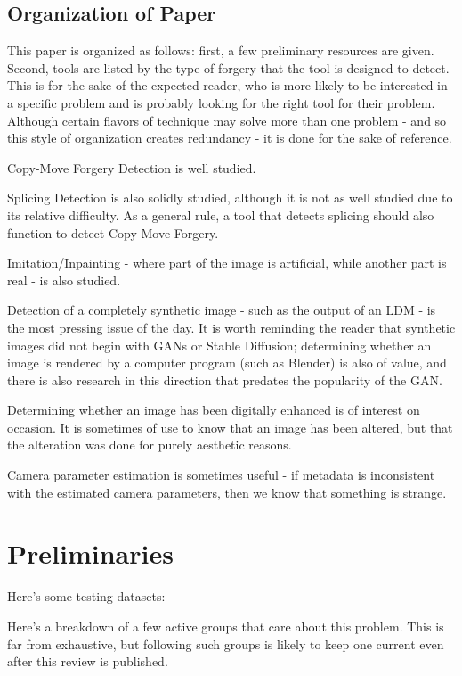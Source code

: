 \documentclass[compsoc]{IEEEtran}
\begin{document}
\subsection{Organization of Paper}
This paper is organized as follows: first, a few preliminary resources are given. Second, tools are listed by the type of forgery that the tool is designed to detect.
This is for the sake of the expected reader, who is more likely to be interested in a specific problem and is probably looking for the right tool for their problem.
Although certain flavors of technique may solve more than one problem - and so this style of organization creates redundancy - it is done for the sake of reference.

Copy-Move Forgery Detection is well studied. 

Splicing Detection is also solidly studied, although it is not as well studied due to its relative difficulty. As a general rule, a tool that detects splicing should also function to detect Copy-Move Forgery.

Imitation/Inpainting - where part of the image is artificial, while another part is real - is also studied.

Detection of a completely synthetic image - such as the output of an LDM - is the most pressing issue of the day.
It is worth reminding the reader that synthetic images did not begin with GANs or Stable Diffusion; determining whether an image is rendered by a computer program (such as Blender) is also of value, and there is also research in this direction that predates the popularity of the GAN.

Determining whether an image has been digitally enhanced is of interest on occasion. It is sometimes of use to know that an image has been altered, but that the alteration was done for purely aesthetic reasons.

Camera parameter estimation is sometimes useful - if metadata is inconsistent with the estimated camera parameters, then we know that something is strange.

\section{Preliminaries}

Here's some testing datasets:

Here's a breakdown of a few active groups that care about this problem. This is far from exhaustive, but following such groups is likely to keep one current even after this review is published.
\end{document}
